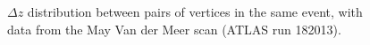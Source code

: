 \begin{figure}[h]
	\centering
	\caption{$\Delta z$ distribution between pairs of vertices in the same event, with data from the May Van der Meer scan (ATLAS run 182013).}
	\label{fig:luminosity-deltaz}
\end{figure}


